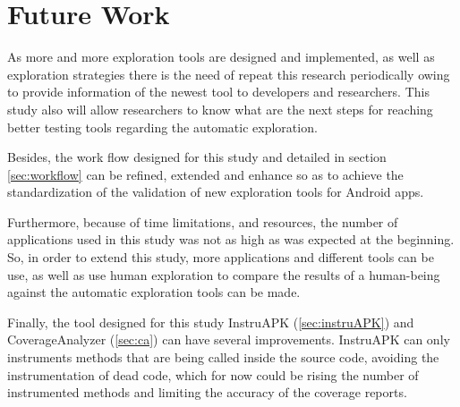 
\chapter{Future Work} %

\label{Chapter6} %

As more and more exploration tools are designed and implemented, as well as exploration strategies there is the need of repeat this research periodically owing to provide information of the newest tool to developers and researchers. This study also will allow researchers to know what are the next steps for reaching better testing tools regarding the automatic exploration. 

Besides, the work flow designed for this study and detailed in section \ref{sec:workflow} can be refined, extended and enhance so as to achieve the standardization of the validation of new exploration tools for Android apps. 

Furthermore, because of time limitations, and resources, the number of applications used in this study was not as high as was expected at the beginning. So, in order to extend this study, more applications and different tools can be use, as well as use human exploration to compare the results of a human-being against the automatic exploration tools can be made.

Finally, the tool designed for this study InstruAPK (\ref{sec:instruAPK}) and CoverageAnalyzer (\ref{sec:ca}) can have several improvements. InstruAPK can only instruments methods that are being called inside the source code, avoiding the instrumentation of dead code, which for now could be rising the number of instrumented methods and limiting the accuracy of the coverage reports.